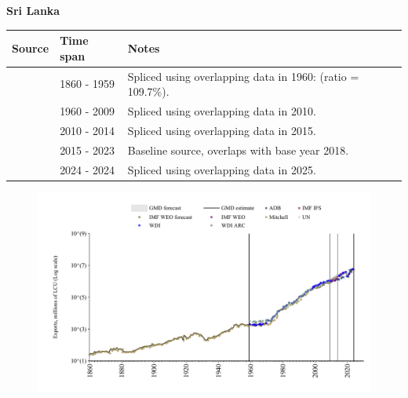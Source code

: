 \documentclass[12pt,a4paper,landscape]{article}
\begin{document}
\begin{adjustbox}{max totalsize={\paperwidth}{\paperheight},center}
\begin{minipage}[t][\textheight][t]{\textwidth}
\vspace*{0.5cm}
{}
\begin{center}
{\Large\bfseries Sri Lanka}
\end{center}
\vspace{0.5cm}
\begin{table}[H]
\centering
\small
\begin{tabular}{|l|l|l|}
\hline
\textbf{Source} & \textbf{Time span} & \textbf{Notes} \\
\hline
\rowcolor{white}\cite{Mitchell}& 1860 - 1959 &Spliced using overlapping data in 1960: (ratio = 109.7\%).\\
\rowcolor{lightgray}\cite{WDI}& 1960 - 2009 &Spliced using overlapping data in 2010.\\
\rowcolor{white}\cite{UN}& 2010 - 2014 &Spliced using overlapping data in 2015.\\
\rowcolor{lightgray}\cite{WDI}& 2015 - 2023 &Baseline source, overlaps with base year 2018.\\
\rowcolor{white}\cite{IMF_IFS}& 2024 - 2024 &Spliced using overlapping data in 2025.\\
\hline
\end{tabular}
\end{table}
\begin{figure}[H]
\centering
\includegraphics[width=\textwidth,height=0.6\textheight,keepaspectratio]{graphs/LKA_exports.pdf}
\end{figure}
\end{minipage}
\end{adjustbox}
\end{document}
